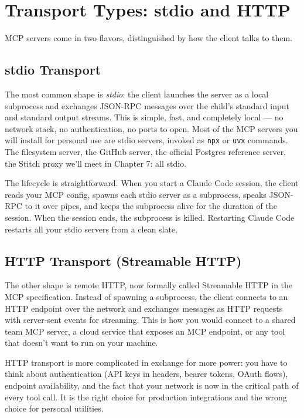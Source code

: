 \documentclass[11pt,letterpaper,openany]{book}
\begin{document}
\section{Transport Types: stdio and HTTP}

MCP servers come in two flavors, distinguished by how the client talks
to them.

\subsection{stdio Transport}

The most common shape is \emph{stdio}: the client launches the server as
a local subprocess and exchanges JSON-RPC messages over the child's
standard input and standard output streams. This is simple, fast, and
completely local --- no network stack, no authentication, no ports to
open. Most of the MCP servers you will install for personal use are
stdio servers, invoked as \texttt{npx} or \texttt{uvx} commands. The
filesystem server, the GitHub server, the official Postgres reference
server, the Stitch proxy we'll meet in Chapter 7: all stdio.

The lifecycle is straightforward. When you start a Claude Code session,
the client reads your MCP config, spawns each stdio server as a
subprocess, speaks JSON-RPC to it over pipes, and keeps the subprocess
alive for the duration of the session. When the session ends, the
subprocess is killed. Restarting Claude Code restarts all your stdio
servers from a clean slate.

\subsection{HTTP Transport (Streamable HTTP)}

The other shape is remote HTTP, now formally called Streamable HTTP in
the MCP specification. Instead of spawning a subprocess, the client
connects to an HTTP endpoint over the network and exchanges messages as
HTTP requests with server-sent events for streaming. This is how you
would connect to a shared team MCP server, a cloud service that exposes
an MCP endpoint, or any tool that doesn't want to run on your machine.

HTTP transport is more complicated in exchange for more power: you have
to think about authentication (API keys in headers, bearer tokens, OAuth
flows), endpoint availability, and the fact that your network is now in
the critical path of every tool call. It is the right choice for
production integrations and the wrong choice for personal utilities.
\end{document}
